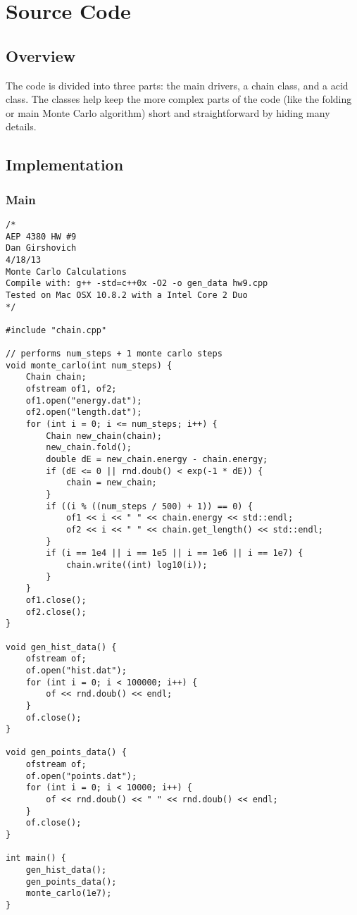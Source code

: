 \documentclass[12pt]{article}
\begin{document}
\section{Source Code}
\subsection{Overview}
The code is divided into three parts: the main drivers, a chain class, and a acid class. The classes help keep the more complex parts of the code (like the folding or main Monte Carlo algorithm) short and straightforward by hiding many details.
\subsection{Implementation}
\subsubsection{Main}
\begin{lstlisting}
/*
AEP 4380 HW #9
Dan Girshovich
4/18/13
Monte Carlo Calculations
Compile with: g++ -std=c++0x -O2 -o gen_data hw9.cpp
Tested on Mac OSX 10.8.2 with a Intel Core 2 Duo
*/

#include "chain.cpp"

// performs num_steps + 1 monte carlo steps
void monte_carlo(int num_steps) {
    Chain chain;
    ofstream of1, of2;
    of1.open("energy.dat");
    of2.open("length.dat");
    for (int i = 0; i <= num_steps; i++) {
        Chain new_chain(chain);
        new_chain.fold();
        double dE = new_chain.energy - chain.energy;
        if (dE <= 0 || rnd.doub() < exp(-1 * dE)) {
            chain = new_chain;
        }
        if ((i % ((num_steps / 500) + 1)) == 0) {
            of1 << i << " " << chain.energy << std::endl;
            of2 << i << " " << chain.get_length() << std::endl;
        }
        if (i == 1e4 || i == 1e5 || i == 1e6 || i == 1e7) {
            chain.write((int) log10(i));
        }
    }
    of1.close();
    of2.close();
}

void gen_hist_data() {
    ofstream of;
    of.open("hist.dat");
    for (int i = 0; i < 100000; i++) {
        of << rnd.doub() << endl;
    }
    of.close();
}

void gen_points_data() {
    ofstream of;
    of.open("points.dat");
    for (int i = 0; i < 10000; i++) {
        of << rnd.doub() << " " << rnd.doub() << endl;
    }
    of.close();
}

int main() {
    gen_hist_data();
    gen_points_data();
    monte_carlo(1e7);
}
\end{lstlisting}
\end{document}
